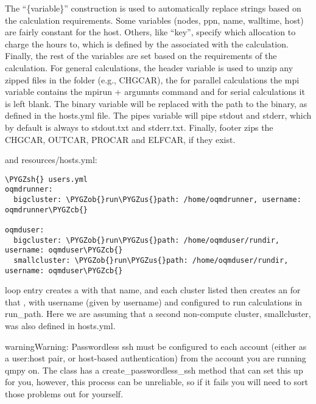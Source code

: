 \documentclass[letterpaper,10pt,english]{sphinxmanual}
\def\PYGZus{\char`\_}
\def\PYGZob{\char`\{}
\def\PYGZcb{\char`\}}
\def\PYGZsh{\char`\#}
\begin{document}
The ``\{variable\}'' construction is used to automatically replace strings based on
the calculation requirements. Some variables (nodes, ppn, name, walltime, host)
are fairly constant for the host. Others, like ``key'', specify which allocation
to charge the hours to, which is defined by the {\hyperref[models:qmpy.Allocation]{}}
associated with the calculation. Finally, the rest of the variables are set
based on the requirements of the calculation. For general calculations, the
header variable is used to unzip any zipped files in the folder (e.g., CHGCAR),
the for parallel calculations the mpi variable contains the mpirun + argumnts
command and for serial calculations it is left blank. The binary variable will
be replaced with the path to the binary, as defined in the hosts.yml file. The
pipes variable will pipe stdout and stderr, which by default is always to
stdout.txt and stderr.txt. Finally, footer zips the CHGCAR, OUTCAR, PROCAR and
ELFCAR, if they exist.

and resources/hosts.yml:

\begin{Verbatim}[commandchars=\\\{\}]
\PYGZsh{} users.yml
oqmdrunner:
  bigcluster: \PYGZob{}run\PYGZus{}path: /home/oqmdrunner, username: oqmdrunner\PYGZcb{}

oqmduser:
  bigcluster: \PYGZob{}run\PYGZus{}path: /home/oqmduser/rundir, username: oqmduser\PYGZcb{}
  smallcluster: \PYGZob{}run\PYGZus{}path: /home/oqmduser/rundir, username: oqmduser\PYGZcb{}
\end{Verbatim}

loop entry creates a {\hyperref[models:qmpy.User]{}} with that name, and each cluster listed
then creates an {\hyperref[models:qmpy.Account]{}} for that {\hyperref[models:qmpy.User]{}}, with username
(given by username) and configured to run calculations in run\_path. Here we are
assuming that a second non-compute cluster, smallcluster, was also defined in
hosts.yml.

\begin{notice}{warning}{Warning:}
Passwordless ssh must be configured to each account (either as a user:host
pair, or host-based authentication) from the account you are running qmpy
on. The {\hyperref[models:qmpy.Account]{}} class has a create\_passwordless\_ssh method
that can set this up for you, however, this process can be unreliable, so if
it fails you will need to sort those problems out for yourself.
\end{notice}
\end{document}
